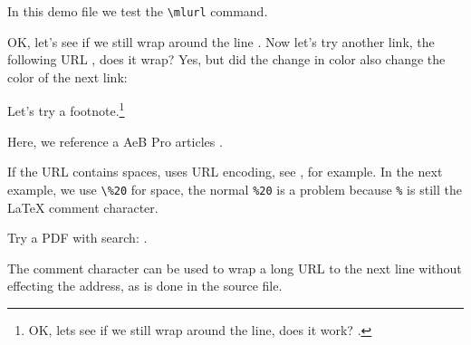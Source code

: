 \documentclass{article}
\begin{document}
In this demo file we test the \verb~\mlurl~ command.

OK, let's see if we still wrap around the line
. Now let's try another link, the following URL
, does it wrap? Yes,
but did the change in color also change the color of the next link: 

Let's try a footnote.\footnote{OK, lets see if we still wrap around the line, does it work?
.}

Here, we reference a \textsf{AeB Pro} articles .

If the URL contains spaces, uses URL encoding, see , for example.
In the next example, we use \verb~\%20~ for space, the normal \texttt{\%20} is a problem because \texttt{\%}
is still the {\LaTeX} comment character.

Try a PDF with search: .

The comment character can be used to wrap a long URL to the next line without effecting the address,
as is done in the source file.
\end{document}
